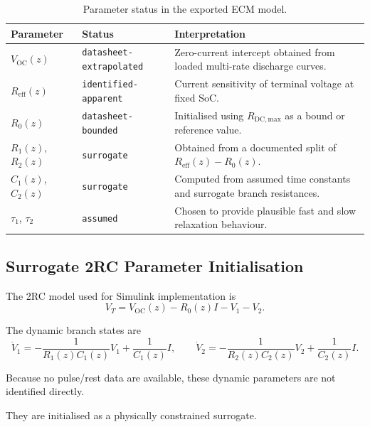 \documentclass[a4paper,12pt]{article}
\begin{document}
\begin{table}[H]
\centering
\caption{Parameter status in the exported ECM model.}
\label{tab:exec_parameter_status_validation}
\begin{tabularx}{0.96\textwidth}{@{}L{0.24\textwidth}L{0.30\textwidth}Y@{}}
\toprule
\textbf{Parameter} &
\textbf{Status} &
\textbf{Interpretation} \\
\midrule
\(V_{\mathrm{OC}}(z)\) &
\texttt{datasheet-extrapolated} &
Zero-current intercept obtained from loaded multi-rate discharge curves. \\
\(R_{\mathrm{eff}}(z)\) &
\texttt{identified-apparent} &
Current sensitivity of terminal voltage at fixed SoC. \\
\(R_0(z)\) &
\texttt{datasheet-bounded} &
Initialised using \(R_{\mathrm{DC,max}}\) as a bound or reference value. \\
\(R_1(z)\), \(R_2(z)\) &
\texttt{surrogate} &
Obtained from a documented split of \(R_{\mathrm{eff}}(z)-R_0(z)\). \\
\(C_1(z)\), \(C_2(z)\) &
\texttt{surrogate} &
Computed from assumed time constants and surrogate branch resistances. \\
\(\tau_1\), \(\tau_2\) &
\texttt{assumed} &
Chosen to provide plausible fast and slow relaxation behaviour. \\
\bottomrule
\end{tabularx}
\end{table}

\subsection{Surrogate 2RC Parameter Initialisation}

The 2RC model used for Simulink implementation is
\begin{equation}
V_T
=
V_{\mathrm{OC}}(z)
-
R_0(z)I
-
V_1
-
V_2.
\label{eq:exec_2rc_voltage}
\end{equation}

The dynamic branch states are
\begin{equation}
\dot{V}_1
=
-\frac{1}{R_1(z)C_1(z)}V_1
+
\frac{1}{C_1(z)}I,
\qquad
\dot{V}_2
=
-\frac{1}{R_2(z)C_2(z)}V_2
+
\frac{1}{C_2(z)}I.
\label{eq:exec_2rc_state_equations}
\end{equation}

Because no pulse/rest data are available, these dynamic parameters are not identified directly.

They are initialised as a physically constrained surrogate.
\end{document}
